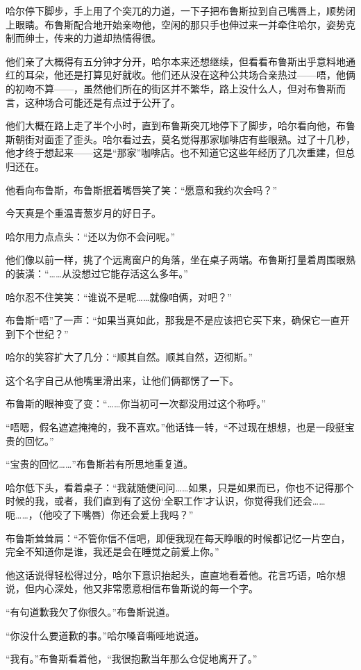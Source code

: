 \documentclass[../main]{subfiles}
\begin{document}
哈尔停下脚步，手上用了个突兀的力道，一下子把布鲁斯拉到自己嘴唇上，顺势闭上眼睛。布鲁斯配合地开始亲吻他，空闲的那只手也伸过来一并牵住哈尔，姿势克制而绅士，传来的力道却热情得很。

他们亲了大概得有五分钟才分开，哈尔本来还想继续，但看看布鲁斯出乎意料地通红的耳朵，他还是打算见好就收。他们还从没在这种公共场合亲热过——唔，他俩的初吻不算——，虽然他们所在的街区并不繁华，路上没什么人，但对布鲁斯而言，这种场合可能还是有点过于公开了。

他们大概在路上走了半个小时，直到布鲁斯突兀地停下了脚步，哈尔看向他，布鲁斯朝街对面歪了歪头。哈尔看过去，莫名觉得那家咖啡店有些眼熟。过了十几秒，他才终于想起来——这是“那家”咖啡店。也不知道它这些年经历了几次重建，但总归还在。

他看向布鲁斯，布鲁斯抿着嘴唇笑了笑：“愿意和我约次会吗？”

今天真是个重温青葱岁月的好日子。

哈尔用力点点头：“还以为你不会问呢。”

他们像以前一样，挑了个远离窗户的角落，坐在桌子两端。布鲁斯打量着周围眼熟的装潢：“……从没想过它能存活这么多年。”

哈尔忍不住笑笑：“谁说不是呢……就像咱俩，对吧？”

布鲁斯“唔”了一声：“如果当真如此，那我是不是应该把它买下来，确保它一直开到下个世纪？”

哈尔的笑容扩大了几分：“顺其自然。顺其自然，迈彻斯。”

这个名字自己从他嘴里滑出来，让他们俩都愣了一下。

布鲁斯的眼神变了变：“……你当初可一次都没用过这个称呼。”

“唔嗯，假名遮遮掩掩的，我不喜欢。”他话锋一转，“不过现在想想，也是一段挺宝贵的回忆。”

“宝贵的回忆\ldots\ldots”布鲁斯若有所思地重复道。

哈尔低下头，看着桌子：“我就随便问问……如果，只是如果而已，你也不记得那个时候的我，或者，我们直到有了这份`全职工作'才认识，你觉得我们还会……呃\ldots\ldots，（他咬了下嘴唇）你还会爱上我吗？”

布鲁斯耸耸肩：“不管你信不信吧，即便我现在每天睁眼的时候都记忆一片空白，完全不知道你是谁，我还是会在睡觉之前爱上你。”

他这话说得轻松得过分，哈尔下意识抬起头，直直地看着他。花言巧语，哈尔想说，但内心深处，他又非常愿意相信布鲁斯说的每一个字。

“有句道歉我欠了你很久。”布鲁斯说道。

“你没什么要道歉的事。”哈尔嗓音嘶哑地说道。

“我有。”布鲁斯看着他，“我很抱歉当年那么仓促地离开了。”
\end{document}
